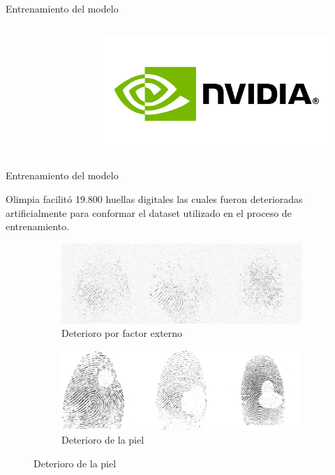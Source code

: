\documentclass[12pt,aspectratio=169]{beamer}
\begin{document}
\begin{frame}{Entrenamiento del modelo}
\begin{columns}[c]
\begin{figure}
            \end{figure}
            \vspace*{-7mm}
            \begin{figure}
                \includegraphics[scale=0.06]{figs/nvidia.png}
            \end{figure}
    \end{columns}

\end{frame}

\begin{frame}{Entrenamiento del modelo}

    Olimpia facilitó 19.800 huellas digitales las cuales fueron deterioradas artificialmente para conformar el dataset utilizado en el proceso de entrenamiento.
    \vspace{5mm}

    \begin{figure}
        \begin{subfigure}{0.48\textwidth}
            \centering
            \includegraphics[scale=0.24]{figs/deterioration_2.png}
            \caption{Deterioro por factor externo}
        \end{subfigure}
        \begin{subfigure}{0.48\textwidth}
            \centering
            \includegraphics[scale=0.24]{figs/deterioration_1.png}
            \caption{Deterioro de la piel}
        \end{subfigure}
    \end{figure}

\end{frame}
\end{document}
